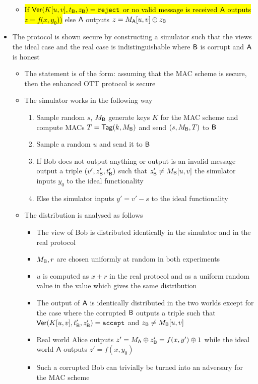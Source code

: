\begin{itemize}
\begin{itemize}
        \item \hl{If $\mathsf{Ver}(K[u,v], t_{\mathsf{B}}, z_{\mathsf{B}}) = \mathtt{reject}$ or no valid message is received $\mathsf{A}$ outputs $z=f(x, y_0$))} else $\mathsf{A}$ outputs $z = M_{\mathsf{A}}[u,v] \oplus z_{\mathsf{B}}$
    \end{itemize}
    \item The protocol is shown secure by constructing a simulator such that the views the ideal case and the real case is indistinguishable where $\mathsf{B}$ is corrupt and $\mathsf{A}$ is honest
    \begin{itemize}
        \item The statement is of the form: assuming that the MAC scheme is secure, then the enhanced OTT protocol is secure
        \item The simulator works in the following way
        \begin{enumerate}
            \item Sample random $s$, $M_{\mathsf{B}}$ generate keys $K$ for the MAC scheme and compute MACs $T= \mathsf{Tag}(k, M_{\mathsf{B}})$ and send $(s, M_{\mathsf{B}}, T)$ to $\mathsf{B}$
            \item Sample a random $u$ and send it to $\mathsf{B}$
            \item If Bob does not output anything or output is an invalid message output a triple $(v', z_{\mathsf{B}}', t_{\mathsf{B}}')$ such that $z'_{\mathsf{B}} \neq M_{\mathsf{B}}[u,v]$ the simulator inputs $y_0$ to the ideal functionality
            \item Else the simulator inputs $y' = v'-s$ to the ideal functionality
        \end{enumerate}
        \item The distribution is analysed as follows
        \begin{itemize}
            \item The view of Bob is distributed identically in the simulator and in the real protocol
            \item $M_{\mathsf{B}}, r$ are chosen uniformly at random in both experiments
            \item $u$ is computed as $x+r$ in the real protocol and as a uniform random value in the value which gives the same distribution
            \item The output of $\mathsf{A}$ is identically distributed in the two worlds except for the case where the corrupted $\mathsf{B}$ outputs a triple such that $\mathsf{Ver}(K[u,v], t_{\mathsf{B}}', z_{\mathsf{B}}') = \texttt{accept}$ and $z_{\mathsf{B}} \neq M_{\mathsf{B}}[u,v]$
            \item Real world Alice outputs $z' = M_{\mathsf{A}} \oplus z_{\mathsf{B}}' = f(x,  y') \oplus 1$ while the ideal world $\mathsf{A}$ outputs $z' = f(x, y_0)$
            \item Such a corrupted Bob can trivially be turned into an adversary for the MAC scheme
        \end{itemize}
    \end{itemize}
\end{itemize}

